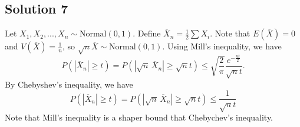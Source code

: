 \subsection*{Solution 7}

Let $X_1, X_2, ..., X_n \sim \mathrm{Normal}(0, 1)$.
Define $\overline{X}_n = \frac{1}{2} \sum X_i$.
Note that $E(\overline{X}) = 0$ and $V(\overline{X}) = \frac{1}{n}$, so $\sqrt{n}\overline{X} \sim \mathrm{Normal}(0, 1)$.
Using Mill's inequality, we have
\begin{equation*}
    P(|\overline{X}_n| \geq t) = P(|\sqrt{n}\,\overline{X}_n| \geq \sqrt{n}t)
        \leq \sqrt{\frac{2}{\pi}} \frac{e^{-\frac{nt}{2}}}{\sqrt{n}t}.
\end{equation*}
By Chebyshev's inequality, we have
\begin{equation*}
    P(|\overline{X}_n| \geq t) = P(|\sqrt{n}\,\overline{X}_n| \geq \sqrt{n}t)
        \leq \frac{1}{\sqrt{n}t}
\end{equation*}
Note that Mill's inequality is a shaper bound that Chebychev's inequality.
